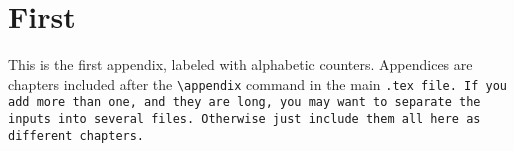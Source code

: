 \chapter{First}
This is the first appendix, labeled with alphabetic counters. Appendices are chapters included after the \verb|\appendix| command in the main \tt{.tex} file. If you add more than one, and they are long, you may want to separate the inputs into several files. Otherwise just include them all here as different chapters.
